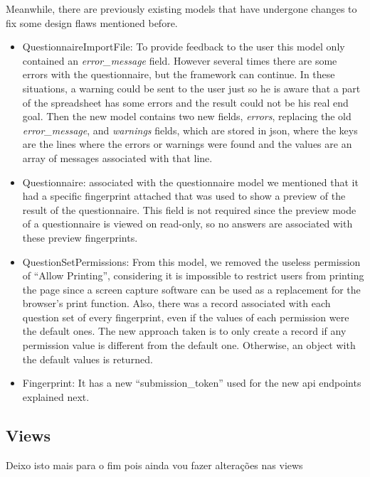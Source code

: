 Meanwhile, there are previously existing models that have undergone changes to fix some design flaws mentioned before.

\begin{itemize}
    \item QuestionnaireImportFile: To provide feedback to the user this model only contained an \textit{error\_message} field.
        However several times there are some errors with the questionnaire, but the framework can continue.
        In these situations, a warning could be sent to the user just so he is aware that a part of the spreadsheet has some errors and the result could not be his real end goal.
        Then the new model contains two new fields, \textit{errors}, replacing the old \textit{error\_message}, and \textit{warnings} fields, which are stored in \gls{json}, where the keys are the lines where the errors or warnings were found and the values are an array of messages associated with that line.
    \item Questionnaire: associated with the questionnaire model we mentioned that it had a specific fingerprint attached that was used to show a preview of the result of the questionnaire.
        This field is not required since the preview mode of a questionnaire is viewed on read-only, so no answers are associated with these preview fingerprints.
    \item QuestionSetPermissions: From this model, we removed the useless permission of ``Allow Printing'', considering it is impossible to restrict users from printing the page since a screen capture software can be used as a replacement for the browser's print function.
        Also, there was a record associated with each question set of every fingerprint, even if the values of each permission were the default ones.
        The new approach taken is to only create a record if any permission value is different from the default one.
        Otherwise, an object with the default values is returned.
    \item Fingerprint: It has a new ``submission\_token'' used for the new \gls{api} endpoints explained next.
\end{itemize}

\subsection{Views}

Deixo isto mais para o fim pois ainda vou fazer alterações nas views

